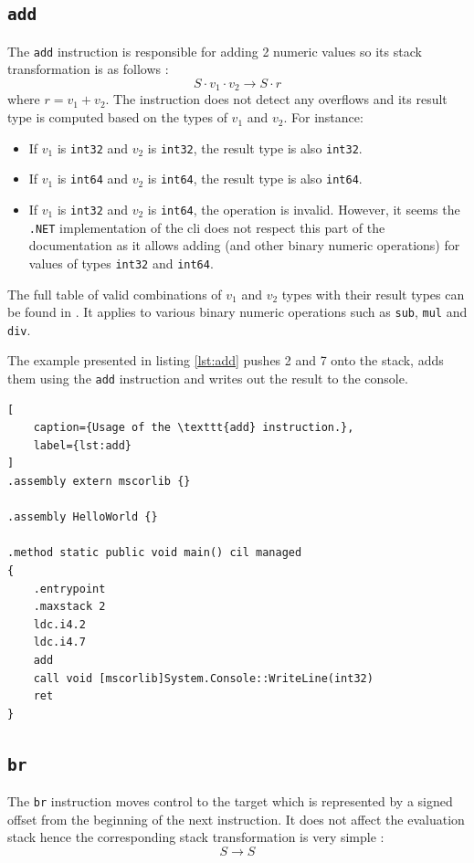 \documentclass[declaration,shortabstract,english,mgr]{iithesis}
\begin{document}
\subsection{\texttt{add}}

The \texttt{add} instruction is responsible for adding 2 numeric values so its stack transformation is as follows \cite{ecmaStandard}:
$$
	S \cdot v_1 \cdot v_2 \rightarrow S \cdot r
$$
where $r = v_1 + v_2$. The instruction does not detect any overflows and its result type is computed based on the types of $v_1$ and $v_2$. For instance:
\begin{itemize}
	\item{If $v_1$ is \texttt{int32} and $v_2$ is \texttt{int32}, the result type is also \texttt{int32}.}
	\item{If $v_1$ is \texttt{int64} and $v_2$ is \texttt{int64}, the result type is also \texttt{int64}.}
	\item{If $v_1$ is \texttt{int32} and $v_2$ is \texttt{int64}, the operation is invalid. However, it seems the \texttt{.NET} implementation of the \acrshort{cli} does not respect this part of the documentation as it allows adding (and other binary numeric operations) for values of types \texttt{int32} and \texttt{int64}.}
\end{itemize}
The full table of valid combinations of $v_1$ and $v_2$ types with their result types can be found in \cite{ecmaStandard}. It applies to various binary numeric operations such as \texttt{sub}, \texttt{mul} and \texttt{div}.

The example presented in listing \ref{lst:add} pushes 2 and 7 onto the stack, adds them using the \texttt{add} instruction and writes out the result to the console.

\begin{lstlisting}[
	caption={Usage of the \texttt{add} instruction.},
	label={lst:add}
]
.assembly extern mscorlib {}

.assembly HelloWorld {}

.method static public void main() cil managed
{
	.entrypoint
	.maxstack 2
	ldc.i4.2
	ldc.i4.7
	add
	call void [mscorlib]System.Console::WriteLine(int32)
	ret
}
\end{lstlisting}

\subsection{\texttt{br}}

The \texttt{br} instruction moves control to the target which is represented by a signed offset from the beginning of the next instruction. It does not affect the evaluation stack hence the corresponding stack transformation is very simple \cite{ecmaStandard}:
$$
	S \rightarrow S
$$
\end{document}
